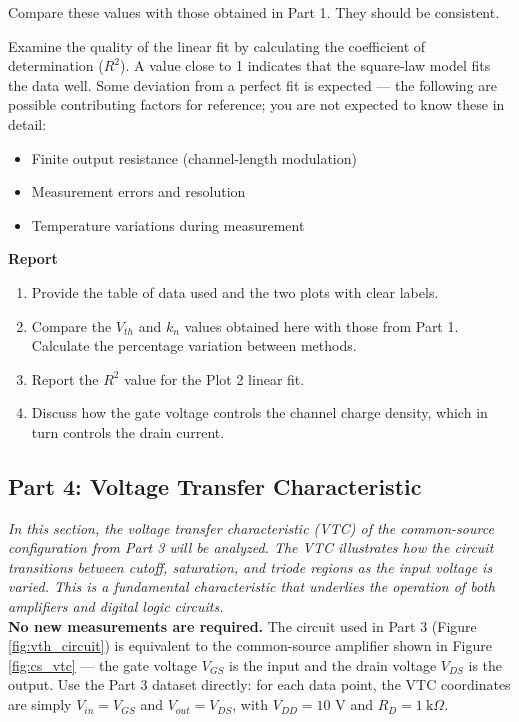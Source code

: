\documentclass[10pt]{article}
\begin{document}
Compare these values with those obtained in Part 1. They should be consistent.

Examine the quality of the linear fit by calculating the coefficient of determination ($R^2$). A value close to 1 indicates that the square-law model fits the data well. Some deviation from a perfect fit is expected — the following are possible contributing factors for reference; you are not expected to know these in detail:
\begin{itemize}
    \item Finite output resistance (channel-length modulation)
    \item Measurement errors and resolution
    \item Temperature variations during measurement
\end{itemize}

\textbf{Report}
\begin{enumerate}
    \item Provide the table of data used and the two plots with clear labels.
    \item Compare the $V_{th}$ and $k_n$ values obtained here with those from Part 1. Calculate the percentage variation between methods.
    \item Report the $R^2$ value for the Plot 2 linear fit.
    \item Discuss how the gate voltage controls the channel charge density, which in turn controls the drain current. \\
\end{enumerate}


\subsection{Part 4: Voltage Transfer Characteristic}
\emph{In this section, the voltage transfer characteristic (VTC) of the common-source configuration from Part 3 will be analyzed. The VTC illustrates how the circuit transitions between cutoff, saturation, and triode regions as the input voltage is varied. This is a fundamental characteristic that underlies the operation of both amplifiers and digital logic circuits.}\\

\textbf{No new measurements are required.} The circuit used in Part 3 (Figure \ref{fig:vth_circuit}) is equivalent to the common-source amplifier shown in Figure \ref{fig:cs_vtc} — the gate voltage $V_{GS}$ is the input and the drain voltage $V_{DS}$ is the output. Use the Part 3 dataset directly: for each data point, the VTC coordinates are simply $V_{in} = V_{GS}$ and $V_{out} = V_{DS}$, with $V_{DD} = 10$ V and $R_D = 1\ \text{k}\Omega$.\\
\end{document}
